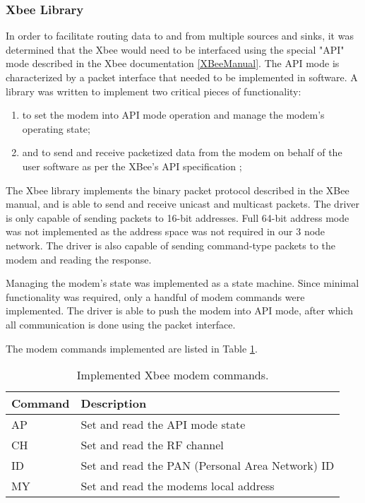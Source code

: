\subsubsection{Xbee Library}

In order to facilitate routing data to and from multiple sources and sinks, it was determined that the Xbee would need to be interfaced using the special "API" mode described in the Xbee documentation \ref{XBeeManual}. The API mode is characterized by a packet interface that needed to be implemented in software. A library was written to implement two critical pieces of functionality:

\begin{enumerate}
\item to set the modem into API mode operation and manage the modem's operating state;
\item and to send and receive packetized data from the modem on behalf of the user software as per the XBee's API specification \cite{XBeeManual};
\end{enumerate}

The Xbee library implements the binary packet protocol described in the XBee manual, and is able to send and receive unicast and multicast packets. The driver is only capable of sending packets to 16-bit addresses. Full 64-bit address mode was not implemented as the address space was not required in our 3 node network. The driver is also capable of sending command-type packets to the modem and reading the response.

Managing the modem's state was implemented as a state machine. Since minimal functionality was required, only a handful of modem commands were implemented. The driver is able to push the modem into API mode, after which all communication is done using the packet interface.

The modem commands implemented are listed in Table \ref{tab:xbee_commands}.

\begin{table}
\caption{Implemented Xbee modem commands.\label{tab:xbee_commands}}
\centering{}
\begin{tabular}{|l|l|}
\hline 
Command & Description \tabularnewline
\hline
\hline
AP & Set and read the API mode state \tabularnewline
\hline
CH & Set and read the RF channel \tabularnewline
\hline 
ID & Set and read the PAN (Personal Area Network) ID \tabularnewline
\hline
MY & Set and read the modems local address \tabularnewline
\hline
\end{tabular}
\end{table}

